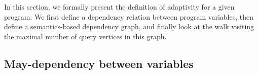  In this section, we formally present the definition of adaptivity for a given program. We first define a dependency relation between program variables, then define a semantics-based dependency graph, and finally look at the walk visiting the maximal number of query vertices in this graph. 

\subsection{May-dependency between variables}
\label{sec:dep}
%
